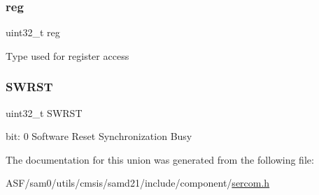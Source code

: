 \subsubsection{\texorpdfstring{reg}{reg}}
{\footnotesize\ttfamily uint32\+\_\+t reg}

Type used for register access \mbox{\label{union_s_e_r_c_o_m___u_s_a_r_t___s_y_n_c_b_u_s_y___type_a34cd956a8da179cbd5fc9060306d420e}} 
\subsubsection{\texorpdfstring{SWRST}{SWRST}}
{\footnotesize\ttfamily uint32\+\_\+t S\+W\+R\+ST}

bit\+: 0 Software Reset Synchronization Busy 

The documentation for this union was generated from the following file\+:\begin{DoxyCompactItemize}
\item 
A\+S\+F/sam0/utils/cmsis/samd21/include/component/\mbox{\hyperlink{utils_2cmsis_2samd21_2include_2component_2sercom_8h}{sercom.\+h}}\end{DoxyCompactItemize}
